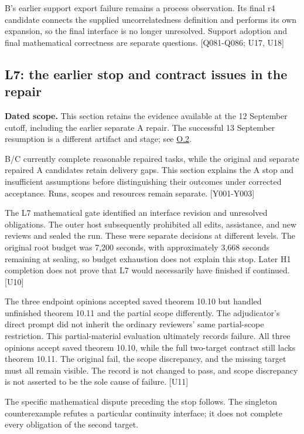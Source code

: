 B's earlier support export failure remains a process observation. Its final r4 candidate connects the supplied uncorrelatedness definition and performs its own expansion, so the final interface is no longer unresolved. Support adoption and final mathematical correctness are separate questions. [Q081-Q086; U17, U18]

\subsection[L7: the earlier stop and contract issues in the repair]{\texorpdfstring{\protect\hypertarget{g16}{}L7: the earlier stop and contract issues in the repair}{L7: the earlier stop and contract issues in the repair}}
\textbf{Dated scope.} This section retains the evidence available at the 12 September cutoff, including the earlier separate A repair. The successful 13 September resumption is a different artifact and stage; see \hyperlink{o2}{O.2}.

B/C currently complete reasonable repaired tasks, while the original and separate repaired A candidates retain delivery gaps. This section explains the A stop and insufficient assumptions before distinguishing their outcomes under corrected acceptance. Runs, scopes and resources remain separate. [Y001-Y003]

The L7 mathematical gate identified an interface revision and unresolved obligations. The outer host subsequently prohibited all edits, assistance, and new reviews and sealed the run. These were separate decisions at different levels. The original root budget was 7,200 seconds, with approximately 3,668 seconds remaining at sealing, so budget exhaustion does not explain this stop. Later H1 completion does not prove that L7 would necessarily have finished if continued. [U10]

The three endpoint opinions accepted saved theorem 10.10 but handled unfinished theorem 10.11 and the partial scope differently. The adjudicator's direct prompt did not inherit the ordinary reviewers' same partial-scope restriction. This partial-material evaluation ultimately records failure. All three opinions accept saved theorem 10.10, while the full two-target contract still lacks theorem 10.11. The original fail, the scope discrepancy, and the missing target must all remain visible. The record is not changed to pass, and scope discrepancy is not asserted to be the sole cause of failure. [U11]

The specific mathematical dispute preceding the stop follows. The singleton counterexample refutes a particular continuity interface; it does not complete every obligation of the second target.

